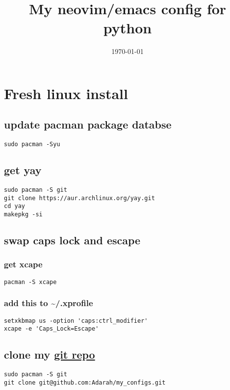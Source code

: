 \documentclass[11pt]{article}
\date{\today}
\title{My neovim/emacs config for python}
\begin{document}
\maketitle

\section{Fresh linux install}
\label{sec:org3c621bb}
\subsection{update pacman package databse}
\label{sec:orgb825a67}
\begin{verbatim}
sudo pacman -Syu
\end{verbatim}
\subsection{get yay}
\label{sec:org1955d5a}
\begin{verbatim}
sudo pacman -S git
git clone https://aur.archlinux.org/yay.git
cd yay
makepkg -si
\end{verbatim}
\subsection{swap caps lock and escape}
\label{sec:orgbc52c86}
\subsubsection{get xcape}
\label{sec:org7c61271}
\begin{verbatim}
pacman -S xcape
\end{verbatim}
\subsubsection{add this to \textasciitilde{}/.xprofile}
\label{sec:org2b63645}
\begin{verbatim}
setxkbmap us -option 'caps:ctrl_modifier'
xcape -e 'Caps_Lock=Escape'
\end{verbatim}
\subsection{clone my \href{https://github.com/https://github.com/Adarah/my\_configs}{git repo}}
\label{sec:org6cbc8ef}
\begin{verbatim}
sudo pacman -S git
git clone git@github.com:Adarah/my_configs.git
\end{verbatim}
\end{document}
